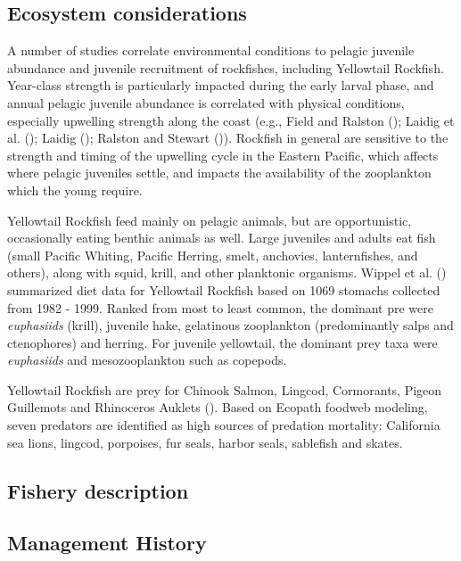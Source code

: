 \documentclass[
]{scrartcl}
\begin{document}
\subsection{Ecosystem considerations}\label{ecosystem-considerations-1}

A number of studies correlate environmental conditions to pelagic
juvenile abundance and juvenile recruitment of rockfishes, including
Yellowtail Rockfish. Year-class strength is particularly impacted during
the early larval phase, and annual pelagic juvenile abundance is
correlated with physical conditions, especially upwelling strength along
the coast (e.g., Field and Ralston ();
Laidig et al. (); Laidig
(); Ralston and Stewart
()). Rockfish in general are sensitive
to the strength and timing of the upwelling cycle in the Eastern
Pacific, which affects where pelagic juveniles settle, and impacts the
availability of the zooplankton which the young require.

Yellowtail Rockfish feed mainly on pelagic animals, but are
opportunistic, occasionally eating benthic animals as well. Large
juveniles and adults eat fish (small Pacific Whiting, Pacific Herring,
smelt, anchovies, lanternfishes, and others), along with squid, krill,
and other planktonic organisms. Wippel et al.
() summarized diet data for Yellowtail
Rockfish based on 1069 stomachs collected from 1982 - 1999. Ranked from
most to least common, the dominant pre were \emph{euphasiids} (krill),
juvenile hake, gelatinous zooplankton (predominantly salps and
ctenophores) and herring. For juvenile yellowtail, the dominant prey
taxa were \emph{euphasiids} and mesozooplankton such as copepods.

Yellowtail Rockfish are prey for Chinook Salmon, Lingcod, Cormorants,
Pigeon Guillemots and Rhinoceros Auklets (). Based on Ecopath foodweb modeling, seven predators are
identified as high sources of predation mortality: California sea lions,
lingcod, porpoises, fur seals, harbor seals, sablefish and skates.

\subsection{Fishery description}\label{fishery-description}

\subsection{Management History}\label{management-history}
\end{document}
